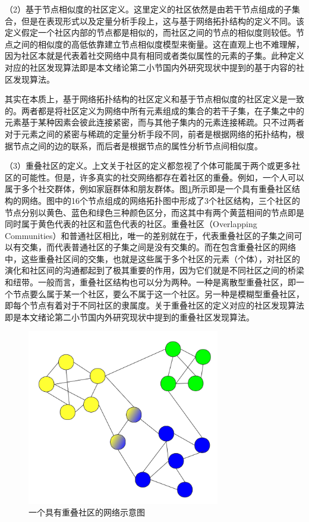 （2）基于节点相似度的社区定义。这里定义的社区依然是由若干节点组成的子集合，但是在表现形式以及定量分析手段上，这与基于网络拓扑结构的定义不同。该定义假定一个社区内部的节点都是相似的，而社区之间的节点的相似度则较低。节点之间的相似度的高低依靠建立节点相似度模型来衡量。这在直观上也不难理解，因为社区本就是代表着社交网络中具有相同或者类似属性的元素的子集。此种定义对应的社区发现算法即是本文绪论第二小节国内外研究现状中提到的基于内容的社区发现算法。

其实在本质上，基于网络拓扑结构的社区定义和基于节点相似度的社区定义是一致的。两者都是将社区定义为网络中所有元素组成的集合的若干子集，在子集之中的元素基于某种因素会彼此连接紧密，而与其他子集内的元素连接稀疏。只不过两者对于元素之间的紧密与稀疏的定量分析手段不同，前者是根据网络的拓扑结构，根据节点之间的边的联系，而后者是根据节点的属性分析节点间相似度。

（3）重叠社区的定义。上文关于社区的定义都忽视了个体可能属于两个或更多社区的可能性。但是，许多真实的社交网络都存在着社区的重叠。例如，一个人可以属于多个社交群体，例如家庭群体和朋友群体。图\ref{fig:fig2-4}所示即是一个具有重叠社区结构的网络。图中的16个节点组成的网络拓扑图中形成了3个社区结构，三个社区的节点分别以黄色、蓝色和绿色三种颜色区分，而这其中有两个黄蓝相间的节点即是同时属于黄色代表的社区和蓝色代表的社区。重叠社区（Overlapping Communities）和普通社区相比，唯一的差别就在于，代表重叠社区的子集之间可以有交集，而代表普通社区的子集之间是没有交集的。而在包含重叠社区的网络中，这些重叠社区间的交集，也就是这些属于多个社区的元素（个体），对社区的演化和社区间的沟通都起到了极其重要的作用，因为它们就是不同社区之间的桥梁和纽带。一般而言，重叠社区结构也可以分为两种。一种是离散型重叠社区，即一个节点要么属于某一个社区，要么不属于这一个社区。另一种是模糊型重叠社区，即每个节点有着对于不同社区的隶属度。关于重叠社区的定义对应的社区发现算法即是本文绪论第二小节国内外研究现状中提到的重叠社区发现算法。

\begin{figure}
  \centering
  \includegraphics[width=0.75\textwidth]{figures/fig2-4}
  \caption{一个具有重叠社区的网络示意图}\label{fig:fig2-4}
\end{figure}

